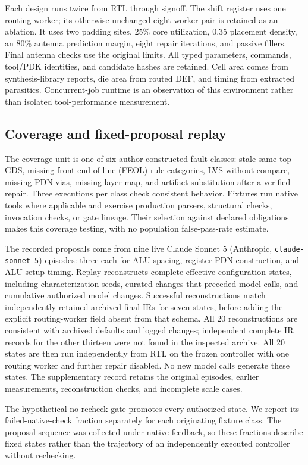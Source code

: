 \documentclass[runningheads]{llncs}
\newcommand{\code}[1]{\texttt{#1}}
\begin{document}
Each design runs twice from RTL through signoff. The shift register uses one
routing worker; its otherwise unchanged eight-worker pair is retained as an
ablation. It uses two padding sites, 25\% core utilization, 0.35 placement
density, an 80\% antenna prediction margin, eight repair iterations, and
passive fillers. Final antenna checks use the original limits. All typed
parameters, commands, tool/PDK identities, and candidate hashes are retained.
Cell area comes from synthesis-library reports, die area from routed DEF, and
timing from extracted parasitics. Concurrent-job runtime is an observation
of this environment rather than isolated tool-performance measurement.

\subsection{Coverage and fixed-proposal replay}
The coverage unit is one of six author-constructed fault classes: stale
same-top GDS, missing front-end-of-line (FEOL) rule categories, LVS without
compare, missing PDN vias, missing layer map, and artifact substitution after
a verified repair. Three executions per class check consistent behavior.
Fixtures run native tools where applicable and exercise production parsers,
structural checks, invocation checks, or gate lineage. Their selection against
declared obligations makes this coverage testing, with no population
false-pass-rate estimate.

The recorded proposals come from nine live Claude Sonnet 5 (Anthropic,
\code{claude-sonnet-5}) episodes: three each for ALU spacing, register PDN
construction, and ALU setup timing. Replay reconstructs complete effective
configuration states, including characterization seeds, curated changes that
preceded model calls, and cumulative authorized model changes. Successful
reconstructions match independently retained archived final IRs for seven
states, before adding the explicit routing-worker field absent from that
schema. All 20 reconstructions are consistent with archived defaults and
logged changes; independent complete IR records for the other thirteen were
not found in the inspected archive. All 20 states
are then run independently from RTL on the frozen controller with one routing
worker and further repair disabled. No new model calls generate these states.
The supplementary record retains the original episodes, earlier measurements,
reconstruction checks, and incomplete scale cases.

The hypothetical no-recheck gate promotes every authorized state. We report
its failed-native-check fraction separately for each originating fixture
class. The proposal sequence was collected under native feedback, so these
fractions describe fixed states rather than the trajectory of an independently
executed controller without rechecking.
\end{document}
